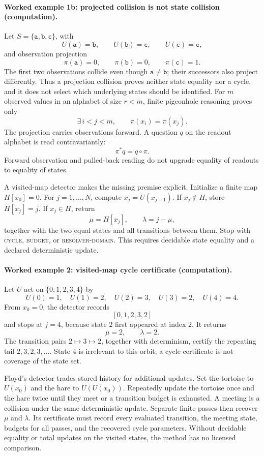 \paragraph{Worked example 1b: projected collision is not state collision (computation).}
Let \(S=\{\mathtt a,\mathtt b,\mathtt c\}\), with
\[
 U(\mathtt a)=\mathtt b,\qquad U(\mathtt b)=\mathtt c,\qquad U(\mathtt c)=\mathtt c,
\]
and observation projection
\[
 \pi(\mathtt a)=0,\qquad\pi(\mathtt b)=0,\qquad\pi(\mathtt c)=1.
\]
The first two observations collide even though \(\mathtt a\ne\mathtt b\); their successors also project differently.
Thus a projection collision proves neither state equality nor a cycle, and it does not select which underlying states
should be identified.  For \(m\) observed values in an alphabet of size \(r<m\), finite pigeonhole reasoning proves
only
\[
                 \exists\,i<j<m,\qquad \pi(x_i)=\pi(x_j).
\]
The projection carries observations forward.  A question \(q\) on the readout alphabet is read contravariantly:
\[
                            \pi^*q=q\circ\pi.
\]
Forward observation and pulled-back reading do not upgrade equality of readouts to equality of states.

A visited-map detector makes the missing premise explicit.  Initialize a finite map
\(H[x_0]=0\).  For \(j=1,\ldots,N\), compute \(x_j=U(x_{j-1})\).  If \(x_j\notin H\), store \(H[x_j]=j\).  If
\(x_j\in H\), return
\[
                  \mu=H[x_j],\qquad\lambda=j-\mu,
\]
together with the two equal states and all transitions between them.  Stop with \textsc{cycle}, \textsc{budget}, or
\textsc{resolver-domain}.  This requires decidable state equality and a declared deterministic update.

\paragraph{Worked example 2: visited-map cycle certificate (computation).}
Let \(U\) act on \(\{0,1,2,3,4\}\) by
\[
             U(0)=1,\quad U(1)=2,\quad U(2)=3,\quad U(3)=2,\quad U(4)=4.
\]
From \(x_0=0\), the detector records
\[
                         [0,1,2,3,2]
\]
and stops at \(j=4\), because state \(2\) first appeared at index \(2\).  It returns
\[
                         \mu=2,\qquad\lambda=2.
\]
The transition pairs \(2\mapsto3\mapsto2\), together with determinism, certify the repeating tail
\(2,3,2,3,\ldots\).  State \(4\) is irrelevant to this orbit; a cycle certificate is not coverage of the state set.

Floyd's detector trades stored history for additional updates.  Set the tortoise to \(U(x_0)\) and the hare to
\(U(U(x_0))\).  Repeatedly update the tortoise once and the hare twice until they meet or a transition budget is
exhausted.  A meeting is a collision under the same deterministic update.  Separate finite passes then recover
\(\mu\) and \(\lambda\).  Its certificate must record every evaluated transition, the meeting state, budgets for all
passes, and the recovered cycle parameters.  Without decidable equality or total updates on the visited states, the
method has no licensed comparison.

